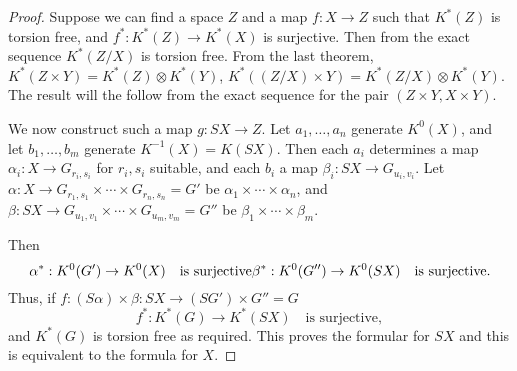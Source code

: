 \documentclass[leqno]{book}
\numberwithin{equation}{section}
\theoremstyle{definition}
\begin{document}
            \begin{proof}
              Suppose we can find a space $Z$ and a map $f:X\to Z$ such that $K^{*}(Z)$ is torsion free, and $f^{*}:K^{*}(Z)\to K^{*}(X)$ is surjective. Then from the exact sequence $K^{*}(Z/X)$ is torsion free. From the last theorem, $K^{*}(Z\times Y)=K^{*}(Z)\otimes K^{*}(Y)$, $K^{*}((Z/X)\times Y)=K^{*}(Z/X)\otimes K^{*}(Y)$. The result will the follow from the exact sequence for the pair $(Z\times Y, X\times Y)$.

              We now construct such a map $g:SX\to Z$. Let $a_1, \ldots ,a_{n}$ generate $K^{0}(X)$, and let $b_1, \ldots ,b_{m}$ generate $K^{-1}(X)=K(SX)$. Then each $a_{i}$ determines a map $\alpha _{i}:X\to G_{r_{i},s_{i}}$ for $r_{i},s_{i}$ suitable, and each $b_{i}$ a map $\beta _{i}:SX\to G_{u_{i},v_{i}}$. Let $\alpha:X\to G_{r_1,s_1}\times \cdots\times G_{r_{n},s_{n}}=G'$ be $\alpha_1\times \cdots\times \alpha _{n}$, and $\beta:SX\to G_{u_1,v_1}\times \cdots\times G_{u_{m},v_{m}}=G''$ be $\beta_1\times \cdots\times \beta_{m}$.

              \noindent Then
              \begin{equation*}
                \alpha^{*}:K^{0}(G')\to K^{0}(X)\quad \text{is surjective}\\
                \beta^{*}:K^{0}(G'')\to K^{0}(SX)\quad \text{is surjective.}
              \end{equation*}
              Thus, if $f:(S\alpha)\times \beta:SX\to (SG')\times G''=G$
              \begin{equation*}
                f^{*}:K^{*}(G)\to K^{*}(SX)\quad \text{is surjective},
              \end{equation*}
              and $K^{*}(G)$ is torsion free as required. This proves the formular for $SX$ and this is equivalent to the formula for $X$.
            \end{proof}
\end{document}
